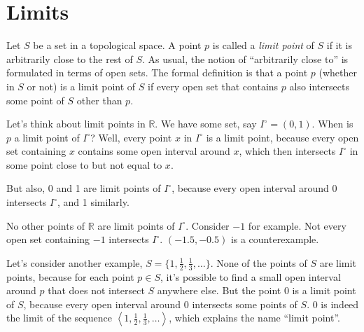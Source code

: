 \documentclass{article}
\def\R{{\mathbb R}}
\begin{document}

\section*{Limits}

Let $S$ be a set in a topological space.  A point $p$ is called a {\em
  limit point\/} of $S$ if it is arbitrarily close to the rest of $S$.
As usual, the notion of ``arbitrarily close to'' is formulated in
terms of open sets.  The formal definition is that a point $p$
(whether in $S$ or not) is a limit point of $S$ if every open set that
contains $p$ also intersects some point of $S$ other than $p$.

Let's think about limit points in $\R$.  We have some set, say
$I^\circ = (0,1)$.  When is $p$ a limit point of $I^\circ$?  Well, every point
$x$ in $I^\circ$ is a limit point, because every open set containing
$x$ contains some open interval around $x$, which then intersects
$I^\circ$ in some point close to but not equal to $x$.

But also, 0 and 1 are limit points of $I^\circ$, because every open
interval around 0 intersects $I^\circ$, and 1 similarly.

No other points of $\R$ are limit points of $I^\circ$.  Consider $-1$
for example.  Not every open set containing $-1$ intersects $I^\circ$.
$(-1.5, -0.5)$ is a counterexample.


Let's consider another example, $S = \{1, \frac12, \frac13, \ldots\}$. 
None of the points of $S$ are limit points, because for each
point $p\in S$, it's possible to find a small open interval around $p$
that does not intersect $S$ anywhere else.  But the point 0 is a limit
point of $S$, because every open interval around 0 intersects some
points of $S$.  0 is indeed the limit of the sequence $\left< 1, \frac12,
\frac13, \ldots\right>$, which explains the name ``limit point''.
\end{document}
